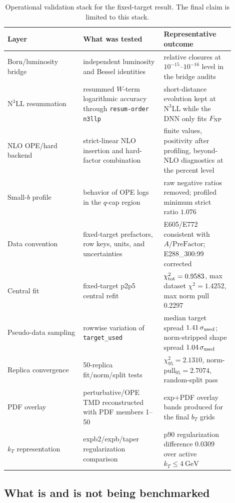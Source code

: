 \documentclass[11pt]{article}
\newcommand{\bt}{b_T}
\newcommand{\kt}{k_T}
\newcommand{\FNP}{F_{\rm NP}}
\newcommand{\chisq}{\chi^2}
\newcommand{\GeV}{\mathrm{GeV}}
\newcommand{\NthreeLL}{\mathrm{N^{3}LL}}
\newcommand{\code}[1]{\texttt{#1}}
\begin{document}
\begin{table}[H]
\centering
\caption{Operational validation stack for the fixed-target result.  The final claim is limited to this stack.}
\label{tab:validationstack}
\begin{tabular}{p{0.30\linewidth}p{0.32\linewidth}p{0.28\linewidth}}
\toprule
Layer & What was tested & Representative outcome \\
\midrule
Born/luminosity bridge & independent luminosity and Bessel identities & relative closures at $10^{-15}$--$10^{-16}$ level in the bridge audits \\
$\NthreeLL$ resummation & resummed $W$-term logarithmic accuracy through \code{resum-order n3llp} & short-distance evolution kept at $\NthreeLL$ while the DNN only fits $\FNP$ \\
NLO OPE/hard backend & strict-linear NLO insertion and hard-factor combination & finite values, positivity after profiling, beyond-NLO diagnostics at the percent level \\
Small-$b$ profile & behavior of OPE logs in the $q$-cap region & raw negative ratios removed; profiled minimum strict ratio $1.076$ \\
Data convention & fixed-target prefactors, row keys, units, and uncertainties & E605/E772 consistent with $A/\mathrm{PreFactor}$; E288\_300:99 corrected \\
Central fit & fixed-target p2p5 central refit & $\chisq_{\rm tot}=0.9583$, max dataset $\chisq=1.4252$, max norm pull $0.2297$ \\
Pseudo-data sampling & rowwise variation of \code{target\_used} & median target spread $1.41\,\sigma_{\rm used}$; norm-stripped shape spread $1.04\,\sigma_{\rm used}$ \\
Replica convergence & 50-replica fit/norm/split tests & $\chisq_{95}=2.1310$, norm-pull$_{95}=2.7074$, random-split pass \\
PDF overlay & perturbative/OPE TMD reconstructed with PDF members 1--50 & exp+PDF overlay bands produced for the final $\bt$ grids \\
$\kt$ representation & expb2/expb/taper regularization comparison & p90 regularization difference $0.0309$ over active $\kt\le4~\GeV$ \\
\bottomrule
\end{tabular}
\end{table}

\subsection{What is and is not being benchmarked}
\end{document}
